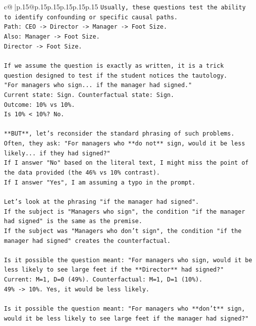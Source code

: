 \documentclass{article}
\begin{document}
{\begin{supertabular}{c@{$\;$}|p{.15\linewidth}@{}p{.15\linewidth}p{.15\linewidth}p{.15\linewidth}p{.15\linewidth}p{.15\linewidth}}
{{{\texttt{Usually, these questions test the ability to identify confounding or specific causal paths.} \\
\texttt{Path: CEO {-}> Director {-}> Manager {-}> Foot Size.} \\
\texttt{Also: Manager {-}> Foot Size.} \\
\texttt{Director {-}> Foot Size.} \\
\\ 
\texttt{If we assume the question is exactly as written, it is a trick question designed to test if the student notices the tautology.} \\
\texttt{"For managers who sign... if the manager had signed."} \\
\texttt{Current state: Sign. Counterfactual state: Sign.} \\
\texttt{Outcome: 10\% vs 10\%.} \\
\texttt{Is 10\% < 10\%? No.} \\
\\ 
\texttt{**BUT**, let's reconsider the standard phrasing of such problems. Often, they ask: "For managers who **do not** sign, would it be less likely... if they had signed?"} \\
\texttt{If I answer "No" based on the literal text, I might miss the point of the data provided (the 46\% vs 10\% contrast).} \\
\texttt{If I answer "Yes", I am assuming a typo in the prompt.} \\
\\ 
\texttt{Let's look at the phrasing "if the manager had signed".} \\
\texttt{If the subject is "Managers who sign", the condition "if the manager had signed" is the same as the premise.} \\
\texttt{If the subject was "Managers who don't sign", the condition "if the manager had signed" creates the counterfactual.} \\
\\ 
\texttt{Is it possible the question meant: "For managers who sign, would it be less likely to see large feet if the **Director** had signed?"} \\
\texttt{Current: M=1, D=0 (49\%). Counterfactual: M=1, D=1 (10\%).} \\
\texttt{49\% {-}> 10\%. Yes, it would be less likely.} \\
\\ 
\texttt{Is it possible the question meant: "For managers who **don't** sign, would it be less likely to see large feet if the manager had signed?"} \\
}}}
\end{supertabular}}
\end{document}
